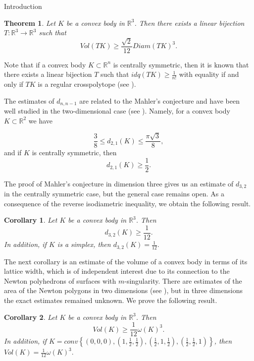 \documentclass[12pt]{article}
\newcommand\R{\mathbb R}
\newtheorem{theorem}{Theorem}[section]
\newtheorem{Corollary}{Corollary}[section]
\begin{document}
\begin{section}{Introduction}
    

    \begin{theorem}
    \label{main-th}
        Let $K$ be a convex body in $\R^{3}$. Then there exists a linear bijection $T:\mathbb{R}^{3}\to \mathbb{R}^{3}$ such that $$
            Vol(TK)\geq \frac{\sqrt{2}}{12}Diam(TK)^3.
        $$      
    \end{theorem}

    Note that if a convex body $K \subset \mathbb{R}^{n}$ is centrally symmetric, then it is known that there exists a linear bijection $T$ such that $idq(TK)\geq \frac{1}{n!}$  with equality if and only if $TK$ is a regular crosspolytope (see \cite{barthe}). 

    The estimates of $d_{n,n-1}$ are related to the Mahler's conjecture and have been well studied in the two-dimensional case (see \cite{ makai2016, AAA23}). Namely, for a convex body $K\subset \mathbb{R}^2$ we have
    
        $$
            \frac{3}{8}\leq d_{2,1}(K)\leq\frac{\pi \sqrt{3}}{8}, $$ 
    and if $K$ is centrally symmetric, then 
    $$
        d_{2,1}(K)\geq \frac{1}{2}.
    $$
    
    The proof of Mahler's conjecture in dimension three gives us an estimate of $d_{3,2}$ in the centrally symmetric case, but the general case remains open. As a consequence of the reverse isodiametric inequality, we obtain the following result.
    \begin{Corollary}
    \label{d32}
         Let $K$ be a convex body in $\R^{3}$. Then 
         $$
            d_{3,2}(K)\geq \frac{1}{12}.
         $$
    In addition, if $K$ is a simplex, then $d_{3,2}(K) = \frac{1}{12}.$
    \end{Corollary}

    The next corollary is an estimate of the volume of a  convex body in terms of its lattice width, which is of independent interest due to its connection to the Newton 
polyhedrons of surfaces with $m$-singularity. There are estimates of the area of the Newton polygons in two dimensions (see \cite{nk1,nk2}), but in three dimensions the exact estimates remained unknown. We prove the following result.  
    \begin{Corollary}
    \label{lattice-width}
        Let $K$ be a convex body in $\R^{3}$. Then 
         $$
            Vol(K)\geq \frac{1}{12}\omega(K)^3.
         $$
    In addition, if $K = conv\left\{(0,0,0),  \left(1,\frac{1}{2},\frac{1}{2}\right),\left(\frac{1}{2},1,\frac{1}{2}\right),\left(\frac{1}{2},\frac{1}{2},1\right)\right\}$, then $Vol(K) = \frac{1}{12}\omega(K)^3.$
    \end{Corollary}

    

    
        
\end{section}
\end{document}
